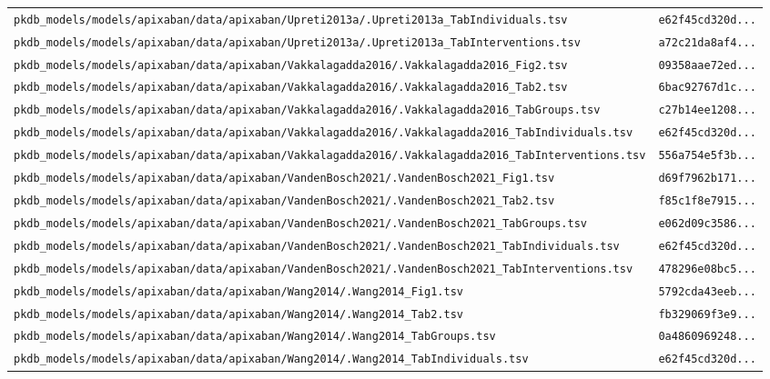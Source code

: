 \documentclass{article}
\begin{document}
\begin{longtable}{ll}
\texttt{pkdb\_models/models/apixaban/data/apixaban/Upreti2013a/.Upreti2013a\_TabIndividuals.tsv} & \texttt{e62f45cd320d...} \\
\texttt{pkdb\_models/models/apixaban/data/apixaban/Upreti2013a/.Upreti2013a\_TabInterventions.tsv} & \texttt{a72c21da8af4...} \\
\texttt{pkdb\_models/models/apixaban/data/apixaban/Vakkalagadda2016/.Vakkalagadda2016\_Fig2.tsv} & \texttt{09358aae72ed...} \\
\texttt{pkdb\_models/models/apixaban/data/apixaban/Vakkalagadda2016/.Vakkalagadda2016\_Tab2.tsv} & \texttt{6bac92767d1c...} \\
\texttt{pkdb\_models/models/apixaban/data/apixaban/Vakkalagadda2016/.Vakkalagadda2016\_TabGroups.tsv} & \texttt{c27b14ee1208...} \\
\texttt{pkdb\_models/models/apixaban/data/apixaban/Vakkalagadda2016/.Vakkalagadda2016\_TabIndividuals.tsv} & \texttt{e62f45cd320d...} \\
\texttt{pkdb\_models/models/apixaban/data/apixaban/Vakkalagadda2016/.Vakkalagadda2016\_TabInterventions.tsv} & \texttt{556a754e5f3b...} \\
\texttt{pkdb\_models/models/apixaban/data/apixaban/VandenBosch2021/.VandenBosch2021\_Fig1.tsv} & \texttt{d69f7962b171...} \\
\texttt{pkdb\_models/models/apixaban/data/apixaban/VandenBosch2021/.VandenBosch2021\_Tab2.tsv} & \texttt{f85c1f8e7915...} \\
\texttt{pkdb\_models/models/apixaban/data/apixaban/VandenBosch2021/.VandenBosch2021\_TabGroups.tsv} & \texttt{e062d09c3586...} \\
\texttt{pkdb\_models/models/apixaban/data/apixaban/VandenBosch2021/.VandenBosch2021\_TabIndividuals.tsv} & \texttt{e62f45cd320d...} \\
\texttt{pkdb\_models/models/apixaban/data/apixaban/VandenBosch2021/.VandenBosch2021\_TabInterventions.tsv} & \texttt{478296e08bc5...} \\
\texttt{pkdb\_models/models/apixaban/data/apixaban/Wang2014/.Wang2014\_Fig1.tsv} & \texttt{5792cda43eeb...} \\
\texttt{pkdb\_models/models/apixaban/data/apixaban/Wang2014/.Wang2014\_Tab2.tsv} & \texttt{fb329069f3e9...} \\
\texttt{pkdb\_models/models/apixaban/data/apixaban/Wang2014/.Wang2014\_TabGroups.tsv} & \texttt{0a4860969248...} \\
\texttt{pkdb\_models/models/apixaban/data/apixaban/Wang2014/.Wang2014\_TabIndividuals.tsv} & \texttt{e62f45cd320d...} \\

\end{longtable}
\end{document}
